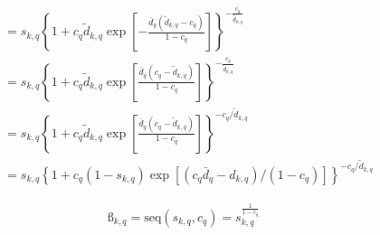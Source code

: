 \documentclass{elsarticle} %
\begin{document}
\begin{align*}
    &=
    s_{k,q} \left\{
        1 + c_q \tilde{d}_{k,q} \exp\left[
            -\frac{
                \bar{d}_{q}
                (\tilde{d}_{k,q} - c_q)
            }{
                1 - c_q
            }
        \right]
    \right\} ^ {-\frac{c_q}{\tilde{d}_{k,q}}}\\
    &=
    s_{k,q} \left\{
        1 + c_q \tilde{d}_{k,q} \exp\left[
            \frac{
                \bar{d}_{q}
                (c_q - \tilde{d}_{k,q})
            }{
                1 - c_q
            }
        \right]
    \right\} ^ {-\frac{c_q}{\tilde{d}_{k,q}}}\\
    &=
    s_{k,q} \left\{
        1 + c_q \tilde{d}_{k,q} \exp\left[
            \frac{
                \bar{d}_{q}
                (c_q - \tilde{d}_{k,q})
            }{
                1 - c_q
            }
        \right]
    \right\} ^ {- c_q / \tilde{d}_{k,q}}\\
    &=
    s_{k,q} \left\{
        1 + c_q (1 - s_{k,q}) \exp\left[
            (
            c_q \bar{d}_{q} - d_{k,q}
            ) / (1 - c_q)
        \right]
    \right\} ^ {
        - c_q / \tilde{d}_{k,q}
    }
\end{align*}

\begin{gather}
    \textit{\ss}_{k,q} = 
    \text{seq}(s_{k,q}, c_q) = 
    s_{k,q} ^ {\frac{1}{1 - c_q}}
\end{gather}
\end{document}
